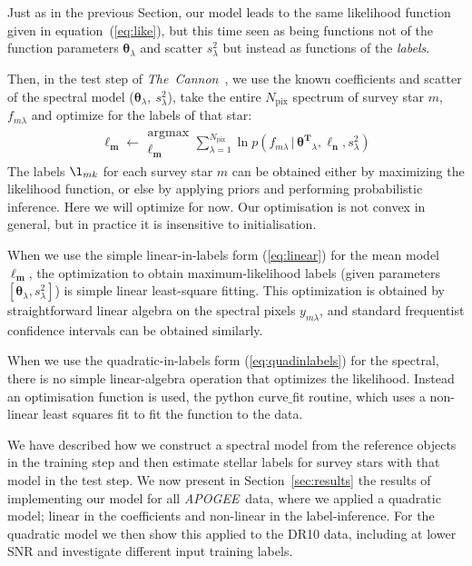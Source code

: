 \documentclass[12pt, preprint]{aastex}
\newcommand{\sectionname}{Section}
\newcommand{\set}[1]{\bm{#1}}
\newcommand{\given}{\,|\,}
\newcommand{\tc}{\textsl{The~Cannon}}
\newcommand{\apogee}{\textsl{APOGEE}}
\newcommand{\pix}{\mathrm{pix}}
\begin{document}
Just as in the previous Section, our model leads to the same likelihood function given in
equation~(\ref{eq:like}), but this time seen as
being functions not of the function parameters $\set{\theta}_\lambda$ and
scatter $s_\lambda^2$ but instead as functions of the \emph{labels}.

Then, in the test step of \tc\ , we use the known coefficients and scatter of the spectral model
($\set{\theta}_\lambda,\ s_\lambda^2$),
take the entire $N_\pix$ spectrum of survey star $m$, $f_{m\lambda}$ and optimize for the labels of that star:
\begin{eqnarray}
\boldsymbol{\ell_m} \leftarrow \substack{\mbox{argmax}\\
{\boldsymbol{\ell_m}  }}
\sum_{\lambda=1}^{N_\pix}
\ln p(f_{m\lambda}\given\set{\theta^T}_\lambda, \boldsymbol{\ell_n}, s_\lambda^2)
\label{eq:teststep}
\end{eqnarray} 
The labels $\l_{mk}$ for each survey star $m$ can be obtained either by maximizing
the likelihood function, or else by applying priors
and performing probabilistic inference.
Here we will optimize for now. Our optimisation is not convex in general, but in practice it is insensitive to initialisation. 

When we use the simple linear-in-labels form (\ref{eq:linear}) for the
mean model $\set{\ell_m}$, the optimization to obtain maximum-likelihood labels
(given parameters $[\set{\theta}_\lambda, s_\lambda^2]$) is simple linear
least-square fitting.
This optimization is obtained by straightforward linear algebra on the
spectral pixels $y_{m\lambda}$, and standard frequentist confidence
intervals can be obtained similarly.

When we use the quadratic-in-labels form (\ref{eq:quadinlabels}) for the
spectral, there is no simple linear-algebra operation that
optimizes the likelihood. 
Instead an optimisation function is used, the python curve$\_$fit routine, which uses a non-linear least squares fit to fit the function to the data. 

We have described how we construct a spectral model from the reference objects in the training step and then 
estimate stellar labels for survey stars with that model in the test step. 
We now present in \sectionname~\ref{sec:results} the results of implementing our model for all \apogee\ data, where we applied a quadratic model; linear in the coefficients and non-linear in the label-inference.  
For the quadratic model we then show this applied to the DR10 data, including at lower SNR and investigate different input training labels. 
\end{document}

